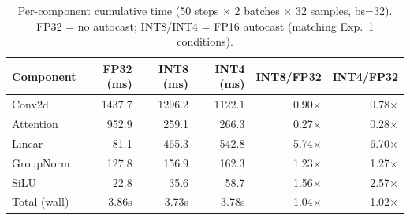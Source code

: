 \begin{table}[htbp]
\centering
\small
\caption{Per-component cumulative time (50 steps $\times$ 2 batches $\times$ 32 samples, bs=32). FP32 = no autocast; INT8/INT4 = FP16 autocast (matching Exp.\ 1 conditions).}
\label{tab:component_breakdown}
\begin{tabular}{lrrrrr}
\toprule
Component & FP32 (ms) & INT8 (ms) & INT4 (ms) & INT8/FP32 & INT4/FP32 \\
\midrule
Conv2d & 1437.7 & 1296.2 & 1122.1 & 0.90$\times$ & 0.78$\times$ \\
Attention & 952.9 & 259.1 & 266.3 & 0.27$\times$ & 0.28$\times$ \\
Linear & 81.1 & 465.3 & 542.8 & 5.74$\times$ & 6.70$\times$ \\
GroupNorm & 127.8 & 156.9 & 162.3 & 1.23$\times$ & 1.27$\times$ \\
SiLU & 22.8 & 35.6 & 58.7 & 1.56$\times$ & 2.57$\times$ \\
Total (wall) & 3.86s & 3.73s & 3.78s & 1.04$\times$ & 1.02$\times$ \\
\bottomrule
\end{tabular}
\end{table}
